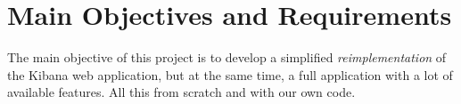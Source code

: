 \documentclass[a4paper, 12pt, english]{book}
\begin{document}






\section{Main Objectives and Requirements}
\label{sec:objectives}

The main objective of this project is to develop a simplified \textit{reimplementation} of the Kibana web application, but at the same time, a full application with a lot of available features. All this from scratch and with our own code.
\end{document}
